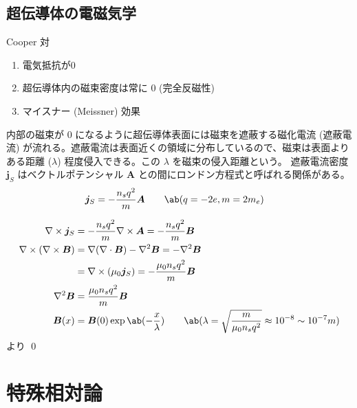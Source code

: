\documentclass[uplatex,dvipdfmx,a4paper,11pt]{jlreq}
\makeatletter
\newcommand{\BB}{\bm{B}}
\renewcommand{\AA}{\bm{A}}
\newcommand{\vnabla}{\mathbf{\nabla}}
\newcommand{\laplacian}{\nabla^2}
\numberwithin{equation}{section}
\theoremstyle{definition}
\renewenvironment{proof}[1][\proofname]{\par
  \normalfont
  \topsep6\p@\@plus6\p@ \trivlist
  \item[\hskip\labelsep{\bfseries #1}\@addpunct{\bfseries}]\ignorespaces\quad\par
}{%
  \qed\endtrivlist\@endpefalse
}
\renewcommand\proofname{証明}
\makeatother
\begin{document}
\subsection{超伝導体の電磁気学}
\begin{definition}
  Cooper 対
  \begin{enumerate}
    \item 電気抵抗が0
    \item 超伝導体内の磁束密度は常に 0 (完全反磁性)
    \item マイスナー (Meissner) 効果
  \end{enumerate}
  内部の磁束が 0 になるように超伝導体表面には磁束を遮蔽する磁化電流 (遮蔽電流) が流れる。遮蔽電流は表面近くの領域に分布しているので、磁束は表面よりある距離 ($\lambda$) 程度侵入できる。この $\lambda$ を磁束の侵入距離という。
  遮蔽電流密度 $\bm{j}_S$ はベクトルポテンシャル $\AA$ との間にロンドン方程式と呼ばれる関係がある。
  \begin{align}
    \bm{j}_S & = - \frac{n_sq^2}{m}\AA \qquad \ab(q = -2e, m = 2m_e)
  \end{align}
\end{definition}

\begin{theorem}
\end{theorem}
\begin{proof}
  \begin{align}
    \vnabla\times\bm{j}_S           & = - \frac{n_sq^2}{m}\vnabla\times\AA = - \frac{n_sq^2}{m}\BB                                                          \\
    \vnabla\times(\vnabla\times\BB) & = \vnabla(\vnabla\cdot\BB) - \laplacian\BB = - \laplacian\BB                                                          \\
                                    & = \vnabla\times(\mu_0\bm{j}_S) = - \frac{\mu_0n_sq^2}{m}\BB                                                           \\
    \laplacian\BB                   & = \frac{\mu_0n_sq^2}{m}\BB                                                                                            \\
    \BB(x)                          & = \BB(0)\exp\ab(-\frac{x}{\lambda}) \qquad \ab(\lambda = \sqrt{\frac{m}{\mu_0n_sq^2}} \approx 10^{-8} \sim 10^{-7} m)
  \end{align}
  より
\end{proof}



\section{特殊相対論}
\end{document}

